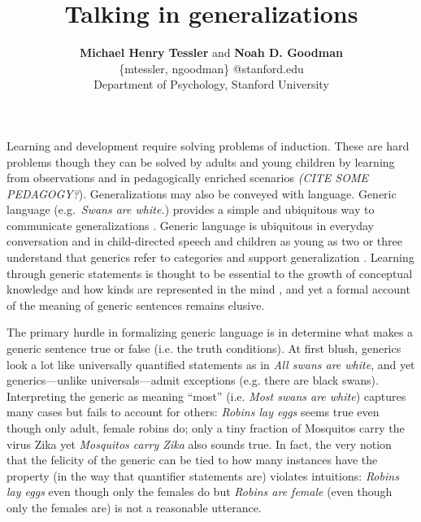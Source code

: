 \documentclass[11pt,letterpaper]{article}
\title{Talking in generalizations}
\author{{\large \bf Michael Henry Tessler} and {\large \bf Noah D. Goodman} \\
\{mtessler, ngoodman\} @stanford.edu\\
  Department of Psychology, Stanford University}
\begin{document}
\maketitle

Learning and development require solving problems of induction.
These are hard problems though they can be solved by adults and young children by learning from observations \cite{Markman1989} 
and in pedagogically enriched scenarios \emph{(CITE SOME PEDAGOGY?}).
Generalizations may also be conveyed with language.
Generic language (e.g.~\emph{Swans are white.}) provides a simple and ubiquitous way to communicate generalizations \cite{Carlson1977, Leslie2008}. 
Generic language is ubiquitous in everyday conversation and in child-directed speech \cite{Gelman2008} and children as young as two or three understand that generics refer to categories and support generalization \cite{Cimpian2008}.
Learning through generic statements is thought to be essential to the growth of conceptual knowledge \cite{Gelman2004} and how kinds are represented in the mind \cite{Leslie2008}, and yet a formal account of the meaning of generic sentences remains elusive. 

The primary hurdle in formalizing generic language is in determine what makes a generic sentence true or false (i.e. the truth conditions).
At first blush, generics look a lot like universally quantified statements as in \emph{All swans are white}, and yet generics---unlike universals---admit exceptions (e.g. there are black swans). 
Interpreting the generic as meaning ``most'' (i.e. \emph{Most swans are white}) captures many cases but fails to account for others: \emph{Robins lay eggs} seems true even though only adult, female robins do; only a tiny fraction of Mosquitos carry the virus Zika yet \emph{Mosquitos carry Zika} also sounds true. 
In fact, the very notion that the felicity of the generic can be tied to how many instances have the property (in the way that quantifier statements are) violates intuitions: \emph{Robins lay eggs} even though only the females do but \emph{Robins are female} (even though only the females are) is not a reasonable utterance.

\end{document}
